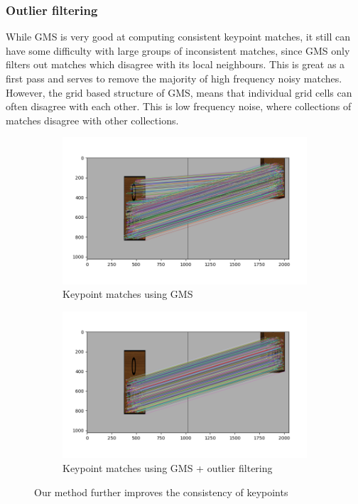 \subsubsection{Outlier filtering}
While GMS is very good at computing consistent keypoint matches, it still can have some difficulty with large groups of inconsistent matches, since GMS only filters out matches which disagree with its local neighbours. This is great as a first pass and serves to remove the majority of high frequency noisy matches. However, the grid based structure of GMS, means that individual grid cells can often disagree with each other. This is low frequency noise, where collections of matches disagree with other collections.\\

\begin{figure}[h]
    \centering
    \begin{subfigure}[t]{0.49\textwidth}
        \includegraphics[width=\textwidth]{figures/outliers-gms.png}
        \caption{Keypoint matches using GMS}
        \label{fig:outliers-gms}
    \end{subfigure}
    \hfill
    \begin{subfigure}[t]{0.49\textwidth}
        \includegraphics[width=\textwidth]{figures/outliers-gms+ours.png}
        \caption{Keypoint matches using GMS + outlier filtering}
        \label{fig:outliers-gms+filter}
    \end{subfigure}
    \caption{Our method further improves the consistency of keypoints}
    \label{fig:consensus-filtering}
\end{figure}

